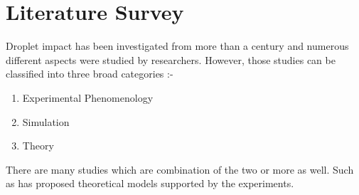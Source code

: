 
\chapter{Literature Survey}

Droplet impact has been investigated from more than a century and numerous different aspects were studied by
researchers. However, those studies can be classified into three broad categories :- 
\begin{enumerate}
 \item Experimental Phenomenology
 \item Simulation
 \item Theory
\end{enumerate}

There are many studies which are combination of the two or more as well. Such as \cite{Mao1997} has proposed theoretical models supported by the experiments. 
